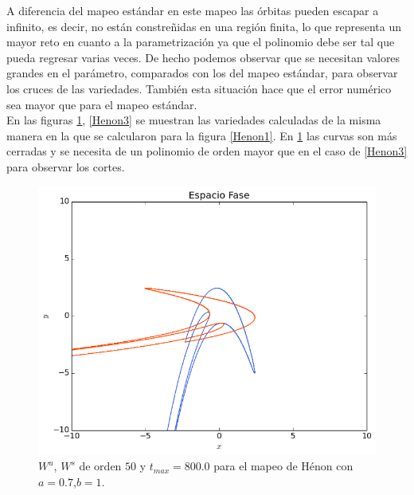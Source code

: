 A diferencia del mapeo estándar en este mapeo las órbitas pueden escapar a infinito, es decir, no están  constreñidas en una región finita, lo que representa un mayor reto en cuanto a la parametrización ya que el polinomio debe ser tal que pueda regresar varias veces. De hecho podemos observar que se necesitan valores grandes en el parámetro, comparados con los del mapeo estándar, para observar los cruces de las variedades. También esta situación hace que el error numérico sea mayor que para el mapeo estándar. \\

En las figuras \ref{Henon2}, \ref{Henon3} se muestran las variedades calculadas de la misma manera en la que se calcularon para la figura \ref{Henon1}. En \ref{Henon2} las curvas son más cerradas y se necesita de un polinomio de orden mayor que en el caso de \ref{Henon3} para observar los cortes. 
\begin{figure}[H]
\centering
\includegraphics[scale=0.6]{henon2}
\caption{$W^{u}$, $W^{s}$ de orden $50$ y $t_{max}=800.0$ para el mapeo de Hénon con $a=0.7$,$b=1.$}
\label{Henon2}
\end{figure}

